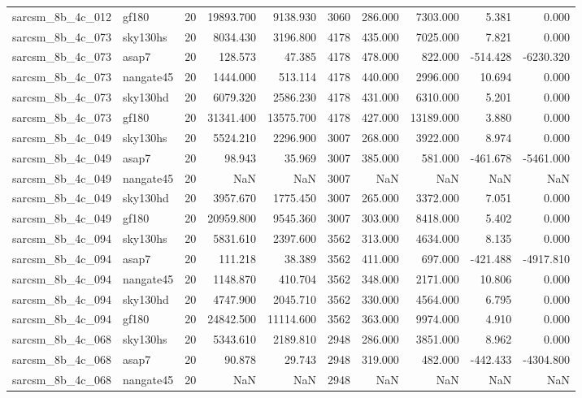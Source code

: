 \begin{longtable}{llrrrrrrrr}
sarcsm\_8b\_4c\_012 & gf180 & 20 & 19893.700 & 9138.930 & 3060 & 286.000 & 7303.000 & 5.381 & 0.000 \\
sarcsm\_8b\_4c\_073 & sky130hs & 20 & 8034.430 & 3196.800 & 4178 & 435.000 & 7025.000 & 7.821 & 0.000 \\
sarcsm\_8b\_4c\_073 & asap7 & 20 & 128.573 & 47.385 & 4178 & 478.000 & 822.000 & -514.428 & -6230.320 \\
sarcsm\_8b\_4c\_073 & nangate45 & 20 & 1444.000 & 513.114 & 4178 & 440.000 & 2996.000 & 10.694 & 0.000 \\
sarcsm\_8b\_4c\_073 & sky130hd & 20 & 6079.320 & 2586.230 & 4178 & 431.000 & 6310.000 & 5.201 & 0.000 \\
sarcsm\_8b\_4c\_073 & gf180 & 20 & 31341.400 & 13575.700 & 4178 & 427.000 & 13189.000 & 3.880 & 0.000 \\
sarcsm\_8b\_4c\_049 & sky130hs & 20 & 5524.210 & 2296.900 & 3007 & 268.000 & 3922.000 & 8.974 & 0.000 \\
sarcsm\_8b\_4c\_049 & asap7 & 20 & 98.943 & 35.969 & 3007 & 385.000 & 581.000 & -461.678 & -5461.000 \\
sarcsm\_8b\_4c\_049 & nangate45 & 20 & NaN & NaN & 3007 & NaN & NaN & NaN & NaN \\
sarcsm\_8b\_4c\_049 & sky130hd & 20 & 3957.670 & 1775.450 & 3007 & 265.000 & 3372.000 & 7.051 & 0.000 \\
sarcsm\_8b\_4c\_049 & gf180 & 20 & 20959.800 & 9545.360 & 3007 & 303.000 & 8418.000 & 5.402 & 0.000 \\
sarcsm\_8b\_4c\_094 & sky130hs & 20 & 5831.610 & 2397.600 & 3562 & 313.000 & 4634.000 & 8.135 & 0.000 \\
sarcsm\_8b\_4c\_094 & asap7 & 20 & 111.218 & 38.389 & 3562 & 411.000 & 697.000 & -421.488 & -4917.810 \\
sarcsm\_8b\_4c\_094 & nangate45 & 20 & 1148.870 & 410.704 & 3562 & 348.000 & 2171.000 & 10.806 & 0.000 \\
sarcsm\_8b\_4c\_094 & sky130hd & 20 & 4747.900 & 2045.710 & 3562 & 330.000 & 4564.000 & 6.795 & 0.000 \\
sarcsm\_8b\_4c\_094 & gf180 & 20 & 24842.500 & 11114.600 & 3562 & 363.000 & 9974.000 & 4.910 & 0.000 \\
sarcsm\_8b\_4c\_068 & sky130hs & 20 & 5343.610 & 2189.810 & 2948 & 286.000 & 3851.000 & 8.962 & 0.000 \\
sarcsm\_8b\_4c\_068 & asap7 & 20 & 90.878 & 29.743 & 2948 & 319.000 & 482.000 & -442.433 & -4304.800 \\
sarcsm\_8b\_4c\_068 & nangate45 & 20 & NaN & NaN & 2948 & NaN & NaN & NaN & NaN \\

\end{longtable}
